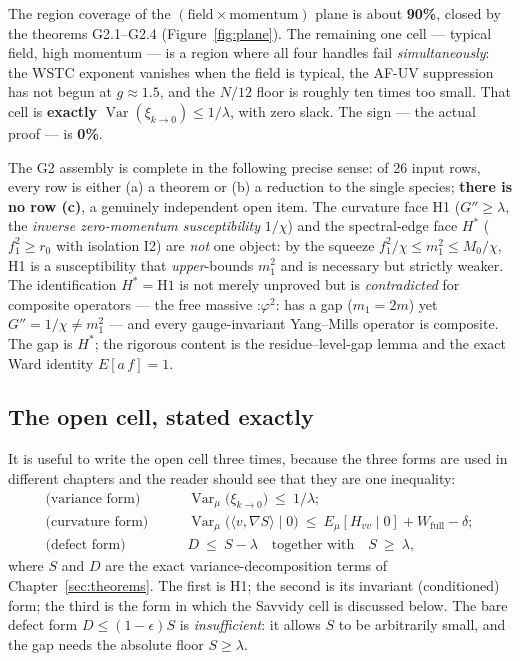 The region coverage of the $(\text{field}\times\text{momentum})$ plane is about \textbf{90\%},
closed by the theorems G2.1--G2.4 (Figure~\ref{fig:plane}). The remaining one cell --- typical
field, high momentum --- is a region where all four handles fail \emph{simultaneously}: the WSTC
exponent vanishes when the field is typical, the AF-UV suppression has not begun at
$g\approx1.5$, and the $N/12$ floor is roughly ten times too small. That cell is
\textbf{exactly} $\operatorname{Var}(\xi_{k\to0})\le1/\lambda$, with zero slack. The sign --- the
actual proof --- is \textbf{0\%}.

The G2 assembly is complete in the following precise sense: of 26 input rows, every row is
either (a) a theorem or (b) a reduction to the single species; \textbf{there is no row (c)}, a
genuinely independent open item. The curvature face H1 ($G''\ge\lambda$, the \emph{inverse
zero-momentum susceptibility} $1/\chi$) and the spectral-edge face $H^*$ ($f_1^2\ge r_0$ with
isolation I2) are \emph{not} one object: by the squeeze $f_1^2/\chi\le m_1^2\le M_0/\chi$, H1 is a
susceptibility that \emph{upper}-bounds $m_1^2$ and is necessary but strictly weaker. The
identification $H^*=\text{H1}$ is not merely unproved but is \emph{contradicted} for composite
operators --- the free massive $\mathord{:}\varphi^2\mathord{:}$ has a gap ($m_1=2m$) yet
$G''=1/\chi\ne m_1^2$ --- and every gauge-invariant Yang--Mills operator is composite. The gap is
$H^*$; the rigorous content is the residue--level-gap lemma and the exact Ward identity $E[a\,f]=1$.

\figplane

\subsection{The open cell, stated exactly}
\label{sec:opencell}

It is useful to write the open cell three times, because the three forms are used in different
chapters and the reader should see that they are one inequality:
\begin{align}
\text{(variance form)}\qquad & \operatorname{Var}_\mu\bigl(\xi_{k\to0}\bigr)\ \le\ 1/\lambda ;
\label{eq:opencell-var}\\
\text{(curvature form)}\qquad &
  \operatorname{Var}_\mu\bigl(\langle v,\nabla S\rangle\mid0\bigr)
  \ \le\ E_\mu[H_{vv}\mid0]+W_{\mathrm{full}}-\delta ;
\label{eq:opencell-curv}\\
\text{(defect form)}\qquad & D\ \le\ S-\lambda\quad\text{together with}\quad S\ \ge\ \lambda ,
\label{eq:opencell-defect}
\end{align}
where $S$ and $D$ are the exact variance-decomposition terms of Chapter~\ref{sec:theorems}. The
first is H1; the second is its invariant (conditioned) form; the third is the form in which the
Savvidy cell is discussed below. The bare defect form $D\le(1-\epsilon)S$ is \emph{insufficient}:
it allows $S$ to be arbitrarily small, and the gap needs the absolute floor $S\ge\lambda$.


